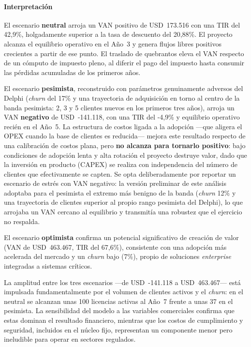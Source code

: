 \paragraph{Interpretación}

El escenario \textbf{neutral} arroja un VAN positivo de USD~173.516 con una TIR del 42,9\%, holgadamente superior a la tasa de descuento del 20,88\%. El proyecto alcanza el equilibrio operativo en el Año~3 y genera flujos libres positivos crecientes a partir de ese punto. El traslado de quebrantos eleva el VAN respecto de un cómputo de impuesto pleno, al diferir el pago del impuesto hasta consumir las pérdidas acumuladas de los primeros años.

El escenario \textbf{pesimista}, reconstruido con parámetros genuinamente adversos del Delphi (\textit{churn} del 17\% y una trayectoria de adquisición en torno al centro de la banda pesimista: 2, 3 y 5 clientes nuevos en los primeros tres años), arroja un VAN \textbf{negativo} de USD~-141.118, con una TIR del -4,9\% y equilibrio operativo recién en el Año~5. La estructura de costos ligada a la adopción —que aligera el OPEX cuando la base de clientes es reducida— mejora este resultado respecto de una calibración de costos plana, pero \textbf{no alcanza para tornarlo positivo}: bajo condiciones de adopción lenta y alta rotación el proyecto destruye valor, dado que la inversión en producto (CAPEX) se realiza con independencia del número de clientes que efectivamente se capten. Se opta deliberadamente por reportar un escenario de estrés con VAN negativo: la versión preliminar de este análisis adoptaba para el pesimista el extremo más benigno de la banda (\textit{churn} 12\% y una trayectoria de clientes superior al propio rango pesimista del Delphi), lo que arrojaba un VAN cercano al equilibrio y transmitía una robustez que el ejercicio no respalda.

El escenario \textbf{optimista} confirma un potencial significativo de creación de valor (VAN de USD~463.467, TIR del 67,6\%), consistente con una adopción más acelerada del mercado y un \textit{churn} bajo (7\%), propio de soluciones \textit{enterprise} integradas a sistemas críticos.

La amplitud entre los tres escenarios —de USD~-141.118 a USD~463.467— está impulsada fundamentalmente por el volumen de clientes activos y el \textit{churn}: en el neutral se alcanzan unas 100 licencias activas al Año~7 frente a unas 37 en el pesimista. La sensibilidad del modelo a las variables comerciales confirma que estas dominan el resultado financiero, mientras que los costos de cumplimiento y seguridad, incluidos en el núcleo fijo, representan un componente menor pero ineludible para operar en sectores regulados.

